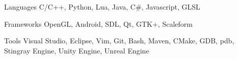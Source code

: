


\begin{cvskills}


\cvskill
{Languages} %
{C/C++, Python, Lua, Java, C\#, Javascript, GLSL } %

\cvskill
{Frameworks}
{OpenGL, Android, SDL, Qt, GTK+, Scaleform}

\cvskill
{Tools}
{Visual Studio, Eclipse, Vim, Git, Bash, Maven, CMake, GDB, pdb, Stingray Engine, Unity Engine, Unreal Engine}



\end{cvskills}
